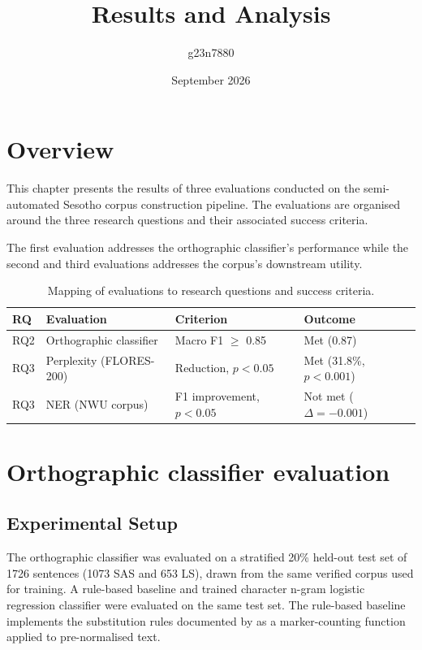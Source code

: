 \documentclass[11pt,a4paper]{article}
\title{Results and Analysis}
\author{g23n7880 }
\date{September 2026}
\begin{document}
\maketitle
\section{Overview}

This chapter presents the results of three evaluations conducted on the semi-automated Sesotho corpus construction pipeline. The evaluations are organised around the three research questions and their associated success criteria. 

The first evaluation addresses the orthographic classifier's  performance while the second and third evaluations addresses the corpus's downstream utility.

\begin{table}[ht]
    \centering
    \begin{tabular}{llll}
     \toprule
    \textbf{RQ} & \textbf{Evaluation} & \textbf{Criterion} &
    \textbf{Outcome} \\
    \midrule
    RQ2 & Orthographic classifier & Macro F1 $\geq$ 0.85 & Met (0.87) \\
    RQ3 & Perplexity (FLORES-200) & Reduction, $p < 0.05$ &
          Met (31.8\%, $p < 0.001$) \\
    RQ3 & NER (NWU corpus) & F1 improvement, $p < 0.05$ &
          Not met ($\Delta = -0.001$) \\
    \bottomrule     
    \end{tabular}
    \caption{Mapping of evaluations to research questions and success criteria.}
    \label{tab:results_map}
\end{table}

\section{Orthographic classifier evaluation}

\subsection{Experimental Setup }

The orthographic classifier was evaluated on a stratified 20\% held-out test set of 1726 sentences (1073 SAS and 653 LS), drawn from the same verified corpus used for training. A rule-based baseline and trained character n-gram logistic regression classifier were evaluated on the same test set. The rule-based baseline implements the substitution rules documented by \citet{makutoane2022people} as a marker-counting function applied to pre-normalised text.
\end{document}
